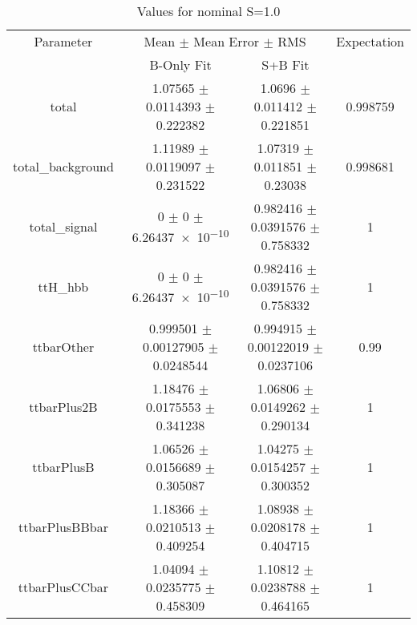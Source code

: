 \begin{table}
\centering
\caption{Values for nominal S=1.0}
\begin{tabular}{cccc}
\toprule
Parameter & \multicolumn{2}{c}{Mean $\pm$ Mean Error $\pm$ RMS} & Expectation\\
 & B-Only Fit & S+B Fit & \\
\midrule
total & \num{1.07565} $\pm$ \num{0.0114393} $\pm$ \num{0.222382} & \num{1.0696} $\pm$ \num{0.011412} $\pm$ \num{0.221851} & \num{0.998759}\\
total\_background & \num{1.11989} $\pm$ \num{0.0119097} $\pm$ \num{0.231522} & \num{1.07319} $\pm$ \num{0.011851} $\pm$ \num{0.23038} & \num{0.998681}\\
total\_signal & \num{0} $\pm$ \num{0} $\pm$ \num{6.26437e-10} & \num{0.982416} $\pm$ \num{0.0391576} $\pm$ \num{0.758332} & \num{1}\\
ttH\_hbb & \num{0} $\pm$ \num{0} $\pm$ \num{6.26437e-10} & \num{0.982416} $\pm$ \num{0.0391576} $\pm$ \num{0.758332} & \num{1}\\
ttbarOther & \num{0.999501} $\pm$ \num{0.00127905} $\pm$ \num{0.0248544} & \num{0.994915} $\pm$ \num{0.00122019} $\pm$ \num{0.0237106} & \num{0.99}\\
ttbarPlus2B & \num{1.18476} $\pm$ \num{0.0175553} $\pm$ \num{0.341238} & \num{1.06806} $\pm$ \num{0.0149262} $\pm$ \num{0.290134} & \num{1}\\
ttbarPlusB & \num{1.06526} $\pm$ \num{0.0156689} $\pm$ \num{0.305087} & \num{1.04275} $\pm$ \num{0.0154257} $\pm$ \num{0.300352} & \num{1}\\
ttbarPlusBBbar & \num{1.18366} $\pm$ \num{0.0210513} $\pm$ \num{0.409254} & \num{1.08938} $\pm$ \num{0.0208178} $\pm$ \num{0.404715} & \num{1}\\
ttbarPlusCCbar & \num{1.04094} $\pm$ \num{0.0235775} $\pm$ \num{0.458309} & \num{1.10812} $\pm$ \num{0.0238788} $\pm$ \num{0.464165} & \num{1}\\
\bottomrule
\end{tabular}
\end{table}